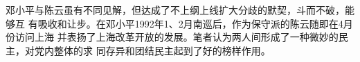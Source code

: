 

邓小平与陈云虽有不同见解，但达成了不上纲上线扩大分歧的默契，斗而不破，能够互
有吸收和让步。在邓小平1992年1、2月南巡后，作为保守派的陈云随即在4月份访问上海
并表扬了上海改革开放的发展。笔者认为两人间形成了一种微妙的民主，对党内整体的求
同存异和团结民主起到了好的榜样作用。









